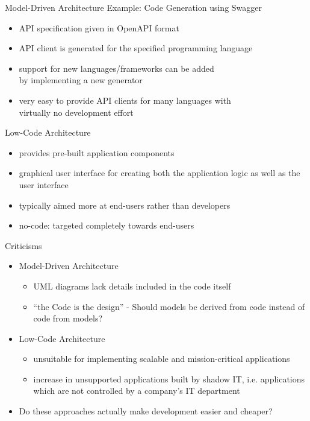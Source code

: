 \documentclass[aspectratio=169]{beamer}
\begin{document}
  \begin{frame}{Model-Driven Architecture}
    Example: Code Generation using Swagger

    \begin{itemize}
      \item API specification given in OpenAPI format
      \item API client is generated for the specified programming language
      \item support for new languages/frameworks can be added \\
            by implementing a new generator
      \item very easy to provide API clients for many languages with \\
            virtually no development effort
    \end{itemize}
  \end{frame}

  \begin{frame}{Low-Code Architecture}
    \begin{itemize}
      \item provides pre-built application components
      \item graphical user interface for creating both the
            application logic as well as the user interface
      \item typically aimed more at end-users rather than developers
      \item no-code: targeted completely towards end-users
    \end{itemize}
  \end{frame}

  \begin{frame}{Criticisms}
    \begin{itemize}
      \item Model-Driven Architecture
        \begin{itemize}
          \item UML diagrams lack details included in the code itself
          \item “the Code is the design” - Should models be derived from code instead of code from models?
        \end{itemize}
      \item Low-Code Architecture
        \begin{itemize}
          \item unsuitable for implementing scalable and mission-critical applications
          \item increase in unsupported applications built by shadow IT,
                i.e. applications which are not controlled by a company's IT department
        \end{itemize}
      \item Do these approaches actually make development easier and cheaper?
    \end{itemize}
  \end{frame}
\end{document}
